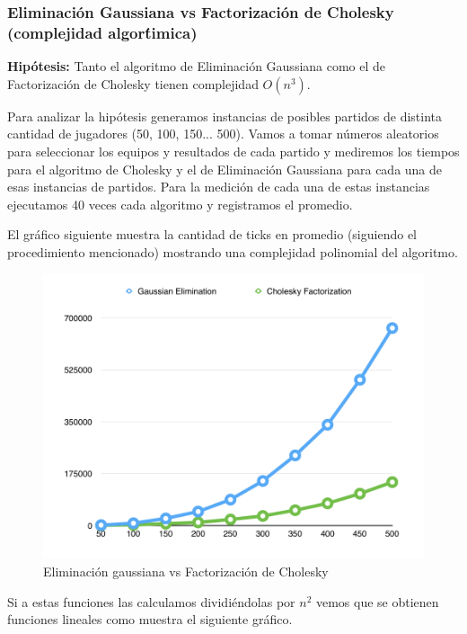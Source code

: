 \subsubsection{Eliminaci\'on Gaussiana vs Factorizaci\'on de Cholesky (complejidad algor\'timica)}

\textbf{Hip\'otesis:} Tanto el algoritmo de Eliminaci\'on Gaussiana como el de Factorizaci\'on de Cholesky tienen complejidad $O(n^{3})$.


Para analizar la hip\'otesis generamos instancias de posibles partidos de distinta cantidad de jugadores (50, 100, 150... 500). Vamos a tomar n\'umeros aleatorios para seleccionar los equipos y resultados de cada partido y mediremos los tiempos para el algoritmo de Cholesky y el de Eliminaci\'on Gaussiana para cada una de esas instancias de partidos. Para la medici\'on de cada una de estas instancias ejecutamos 40 veces cada algoritmo y registramos el promedio.

El gr\'afico siguiente muestra la cantidad de ticks en promedio (siguiendo el procedimiento mencionado) mostrando una complejidad polinomial del algoritmo.


\begin{figure}[h!]
  \begin{center}
	\includegraphics[scale=0.50]{imagenes/cuantitative/default/default1.png}
	\caption{Eliminaci\'on gaussiana vs Factorizaci\'on de Cholesky}
  \end{center}
\end{figure}

Si a estas funciones las calculamos dividi\'endolas por $n^{2}$ vemos que se obtienen funciones lineales como muestra el siguiente gr\'afico.

